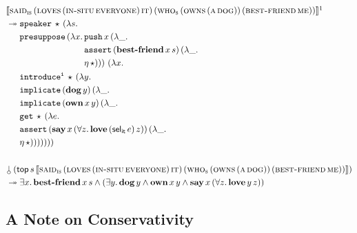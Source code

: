 \begin{align*}
& \sem{\app{\abs{said}_{\abs{is}}}{(\app{\abs{loves}}{(\ap{\abs{in-situ}}{\abs{everyone}})}{\abs{it}})}{(\app{\abs{who}_{\abs{s}}}{(\ap{\abs{owns}}{(\ap{\abs{a}}{\abs{dog}})})}{(\ap{\abs{best-friend}}{\abs{me}})})}}\footnotemark \\
& \tto \begin{aligned}[t]
      &\app{\op{speaker}}{\star}{(\lam{s}{ \\
      &\ap{\op{presuppose}}{(\lam{x}{\begin{aligned}[t]
          &\app{\op{push}}{x}{(\lam{\_}{ \\
          &\app{\op{assert}}{(\app{\obj{best-friend}}{x}{s})}{(\lam{\_}{ \\
          &\etaE{\star}})}})})\ (\lambda x.\,
        \end{aligned}}} \\
      &\app{\op{introduce^i}}{\star}{(\lam{y}{ \\
      &\app{\op{implicate}}{(\ap{\obj{dog}}{y})}{(\lam{\_}{ \\
      &\app{\op{implicate}}{(\app{\obj{own}}{x}{y})}{(\lam{\_}{ \\
      &\app{\op{get}}{\star}{(\lam{e}{ \\
      &\app{\op{assert}}{(\app{\obj{say}}{x}{(\forall z.\, \app{\obj{love}}{(\ap{\selit}{e})}{z})})}{(\lam{\_}{ \\
      &\etaE{\star}})}})}})}})}})})})}
    \end{aligned} \\
  \\
& \ap{\cherry}{(\app{\TOP}{s}{\sem{\app{\abs{said}_{\abs{is}}}{(\app{\abs{loves}}{(\ap{\abs{in-situ}}{\abs{everyone}})}{\abs{it}})}{(\app{\abs{who}_{\abs{s}}}{(\ap{\abs{owns}}{(\ap{\abs{a}}{\abs{dog}})})}{(\ap{\abs{best-friend}}{\abs{me}})})}}})} \\
& \tto \exists x.\, \app{\obj{best-friend}}{x}{s} \land (\exists y.\, \ap{\obj{dog}}{y} \land \app{\obj{own}}{x}{y} \land \app{\obj{say}}{x}{(\forall z.\, \app{\obj{love}}{y}{z})})
\end{align*}



\subsection{A Note on Conservativity}
\label{ssec:conservativity}

